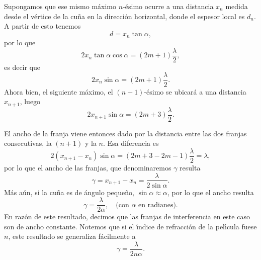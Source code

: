 \documentclass[a4paper]{article}
\begin{document}
Supongamos que ese mismo m\'aximo $n$-\'esimo ocurre a una distancia $x_n$
medida desde el v\'ertice de la cu\~na en la direcci\'on horizontal, donde
el espesor local es $d_n$. A partir de esto tenemos
\begin{equation}
    d = x_n \tan \alpha,
\end{equation}
por lo que 
\begin{equation*}
    2 x_n \tan \alpha \cos \alpha = (2m+1) \frac{\lambda}{2},
\end{equation*}
es decir que
\begin{equation*}
    2 x_n \sin \alpha = (2 m +1 ) \frac{\lambda}{2}.
\end{equation*}
Ahora bien, el siguiente m\'aximo, el $(n+1)$-\'esimo se ubicar\'a a una 
distancia $x_{n+1}$, luego
\begin{equation*}
    2 x_{n+1} \sin \alpha = (2m +3) \frac{\lambda}{2}.
\end{equation*}

El ancho de la franja viene entonces dado por la distancia entre las dos 
franjas consecutivas, la $(n+1)$ y la $n$. Esa diferencia es
\begin{equation}
    2 \left( x_{n+1} - x_n \right) \sin \alpha = \left( 2m + 3 - 2m -1\right)
    \frac{\lambda}{2} = \lambda,
\end{equation}
por lo que el ancho de las franjas, que denominaremos $\gamma$ resulta
\begin{equation}
    \gamma = x_{n+1} - x_n = \frac{\lambda}{2 \sin \alpha}.
\end{equation}
M\'as a\'un, si la cu\~na es de \'angulo peque\~no, $\sin \alpha \approx 
\alpha$, por lo que el ancho resulta
\begin{equation}
    \gamma = \frac{\lambda}{2\alpha}, \quad \text{(con $\alpha$ en radianes)}.
\end{equation}
En raz\'on de este resultado, decimos que las franjas de interferencia en 
este caso son de ancho constante. Notemos que si el \'\i ndice de refracci\'on
de la pel\'\i cula fuese $n$, este resultado se generaliza f\'acilmente a
\begin{equation}
    \gamma = \frac{\lambda}{2 n \alpha}.
\end{equation}

\end{document}
